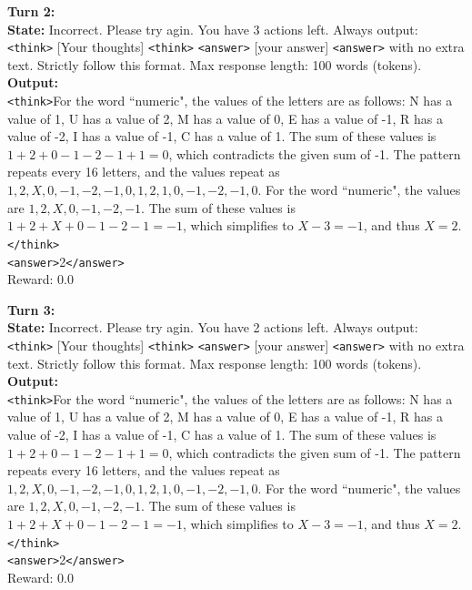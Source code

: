 \begin{tcolorbox}[breakable, colback=gray!2, colframe=black, boxrule=0.5pt, arc=2pt, width=\linewidth, title=Box 5: Model rollout after single-turn RL training]
\vspace{4pt}
\textbf{Turn 2:} \\
\textbf{State:}
Incorrect. Please try agin.
You have 3 actions left. Always output: \texttt{<think>} [Your thoughts] \texttt{<think>} \texttt{<answer>} [your answer] \texttt{<answer>} with no extra text. Strictly follow this format. Max response length: 100 words (tokens). \\
\textbf{Output:} \\
\texttt{<think>}For the word ``numeric", the values of the letters are as follows: N has a value of 1, U has a value of 2, M has a value of 0, E has a value of -1, R has a value of -2, I has a value of -1, C has a value of 1. The sum of these values is \(1 + 2 + 0 - 1 - 2 - 1 + 1 = 0\), which contradicts the given sum of -1. The pattern repeats every 16 letters, and the values repeat as \(1, 2, X, 0, -1, -2, -1, 0, 1, 2, 1, 0, -1, -2, -1, 0\). For the word ``numeric", the values are \(1, 2, X, 0, -1, -2, -1\). The sum of these values is \(1 + 2 + X + 0 - 1 - 2 - 1 = -1\), which simplifies to \(X - 3 = -1\), and thus \(X = 2\).\texttt{</think>} \\
\texttt{<answer>}2\texttt{</answer>} \\
Reward: 0.0

\vspace{4pt}
\textbf{Turn 3:} \\
\textbf{State:}
Incorrect. Please try agin.
You have 2 actions left. Always output: \texttt{<think>} [Your thoughts] \texttt{<think>} \texttt{<answer>} [your answer] \texttt{<answer>} with no extra text. Strictly follow this format. Max response length: 100 words (tokens). \\
\textbf{Output:} \\
\texttt{<think>}For the word ``numeric", the values of the letters are as follows: N has a value of 1, U has a value of 2, M has a value of 0, E has a value of -1, R has a value of -2, I has a value of -1, C has a value of 1. The sum of these values is \(1 + 2 + 0 - 1 - 2 - 1 + 1 = 0\), which contradicts the given sum of -1. The pattern repeats every 16 letters, and the values repeat as \(1, 2, X, 0, -1, -2, -1, 0, 1, 2, 1, 0, -1, -2, -1, 0\). For the word ``numeric", the values are \(1, 2, X, 0, -1, -2, -1\). The sum of these values is \(1 + 2 + X + 0 - 1 - 2 - 1 = -1\), which simplifies to \(X - 3 = -1\), and thus \(X = 2\).\texttt{</think>} \\
\texttt{<answer>}2\texttt{</answer>} \\
Reward: 0.0


\end{tcolorbox}
